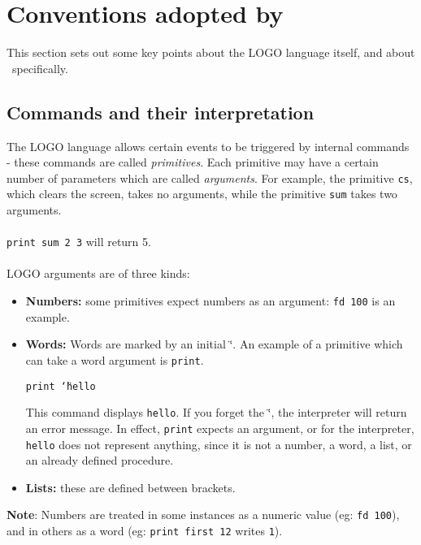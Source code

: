 \chapter{Conventions adopted by \xlogo}

This section sets out some key points about the LOGO language itself,
and about \xlogo\ specifically.


\section{Commands and their interpretation}

The LOGO language allows certain events to be triggered by internal
commands - these commands are called \textit{primitives}. Each primitive
may have a certain number of parameters which are called \textit{arguments}.
For example, the primitive \texttt{cs}, which clears the screen,
takes no arguments, while the primitive \texttt{sum} takes two arguments.\\
\\
 \texttt{print sum 2 3} will return 5.\\
\\
 LOGO arguments are of three kinds:

\begin{itemize}
\item \textbf{Numbers:} some primitives expect numbers as an argument: \texttt{fd
100} is an example. 
\item \textbf{Words:} Words are marked by an initial \char`\"{}. An example
of a primitive which can take a word argument is \texttt{print}. 
\begin{center}
\texttt{print\ \char`\"{}hello}
\end{center}
This command displays \texttt{hello}. If you forget the
\char`\"{}, the interpreter will return an error message. In effect,
\texttt{print} expects an argument, or for the interpreter, \texttt{hello}
does not represent anything, since it is not a number, a word, a list,
or an already defined procedure.
\item \textbf{Lists:} these are defined between brackets.
\end{itemize}
\textbf{Note}: Numbers are treated in some instances as a numeric value (eg: \texttt{fd
100}), and in others as a word (eg: \texttt{print first 12} writes \texttt{1}). \\ \\

